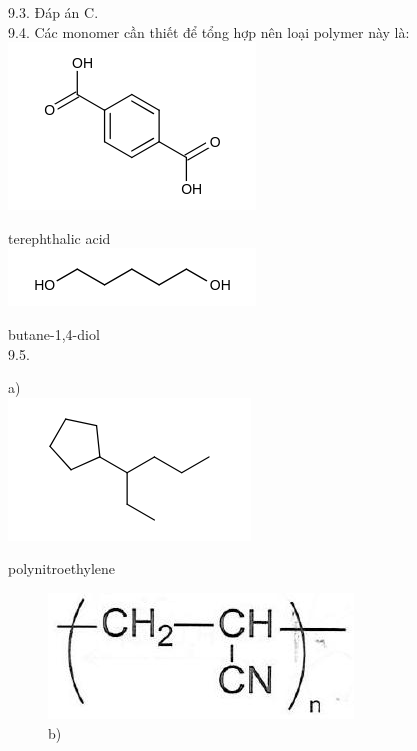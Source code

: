 \documentclass[10pt]{article}
\begin{document}
9.3. Đáp án C.\\
9.4. Các monomer cần thiết để tổng hợp nên loại polymer này là:\\
\includegraphics{smile-d25e5541869c028eab1e96fb84d5a641efcdce10}

terephthalic acid\\
\includegraphics{smile-6ec097451fb87f9c38911acb248ac64477768167}

butane-1,4-diol\\
9.5.

a)\\
\includegraphics{smile-8ab0ec13bab7c24b3034b02464afe9bb5ecfd12b}

polynitroethylene

\begin{figure}[h]
\begin{center}
\captionsetup{labelformat=empty}
\caption{b)}
  \includegraphics[width=\textwidth]{2025_10_23_b4e16b74380d0f7e7700g-060}
\end{center}
\end{figure}
\end{document}
